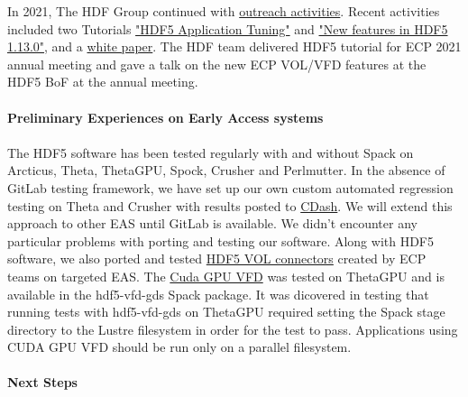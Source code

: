 In 2021, The HDF Group continued with \href{https://www.hdfgroup.org/category/hdf5-resources-for-ecp-users/}{outreach activities}. Recent activities included two Tutorials \href{https://www.hdfgroup.org/2021/05/webinar-followup-hdf5-application-tuning-there-is-more-than-one-way-to-skin-a-catfish-part-2/} {"HDF5 Application Tuning"} and \href{https://www.hdfgroup.org/2021/09/webinar-followup-new-features-in-the-hdf5-1-13-0-release}{"New features in HDF5 1.13.0"}, and a \href{https://portal.hdfgroup.org/pages/viewpage.action?pageId=73924784}{white paper}. The HDF team delivered HDF5 tutorial for ECP 2021 annual meeting and gave a talk on the new ECP VOL/VFD features at the HDF5 BoF at the annual meeting.

\paragraph{Preliminary Experiences on Early Access systems}
\paragraph{}
The HDF5 software has been tested regularly with and without Spack on Arcticus, Theta, ThetaGPU, Spock, Crusher and Perlmutter.  In the absence of GitLab testing framework, we have set up our own custom automated regression testing on Theta and Crusher with results posted to \href{https://cdash.hdfgroup.org}{CDash}.  We will extend this approach to other EAS until GitLab is available.  We didn't encounter any particular problems with porting and testing our software.  Along with HDF5 software, we also ported and tested \href{https://portal.hdfgroup.org/display/support/Registered+VOL+Connectors}{HDF5 VOL connectors} created by ECP teams on targeted EAS.  The \href{https://portal.hdfgroup.org/pages/viewpage.action?pageId=74188097}{Cuda GPU VFD} was tested on ThetaGPU and is available in the hdf5-vfd-gds Spack package.  It was dicovered in testing that running tests with hdf5-vfd-gds on ThetaGPU required setting the Spack stage directory to the Lustre filesystem in order for the test to pass.  Applications using CUDA GPU VFD should be run only on a parallel filesystem. 

\paragraph{Next Steps}
